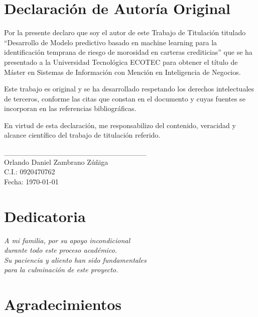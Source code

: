 \chapter*{Declaración de Autoría Original}
\thispagestyle{empty}

Por la presente declaro que soy el autor de este Trabajo de Titulación titulado ``Desarrollo de Modelo predictivo basado en machine learning para la identificación temprana de riesgo de morosidad en carteras crediticias'' que se ha presentado a la Universidad Tecnológica ECOTEC para obtener el título de Máster en Sistemas de Información con Mención en Inteligencia de Negocios.

Este trabajo es original y se ha desarrollado respetando los derechos intelectuales de terceros, conforme las citas que constan en el documento y cuyas fuentes se incorporan en las referencias bibliográficas.

En virtud de esta declaración, me responsabilizo del contenido, veracidad y alcance científico del trabajo de titulación referido.

\vspace{2cm}

\begin{flushright}
\_\_\_\_\_\_\_\_\_\_\_\_\_\_\_\_\_\_\_\_\_\_\_\_\_\_\_\\
Orlando Daniel Zambrano Zúñiga\\
C.I.: 0920470762\\
Fecha: \today
\end{flushright}

\newpage

\chapter*{Dedicatoria}
\thispagestyle{empty}

\begin{flushright}
\emph{A mi familia, por su apoyo incondicional\\
durante todo este proceso académico.\\
Su paciencia y aliento han sido fundamentales\\
para la culminación de este proyecto.}
\end{flushright}

\newpage

\chapter*{Agradecimientos}
\thispagestyle{empty}

